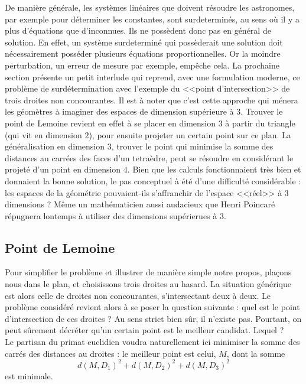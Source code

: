\documentclass{article}
\begin{document}
De manière générale, les systèmes linéaires que doivent résoudre les astronomes, par exemple pour déterminer les constantes, sont surdeterminés, au sens où il y a plus d'équations que d'inconnues. Ils ne possèdent donc pas en général de solution. En effet, un système surdeterminé qui possèderait une solution doit nécessairement posséder plusieurs équations proportionnelles. Or la moindre perturbation, un erreur de mesure par exemple, empêche cela. La prochaine section présente un petit interlude qui reprend, avec une formulation moderne, ce problème de surdétermination avec l'exemple du <<point d'intersection>> de trois droites non concourantes. Il est à noter que c'est cette approche qui ménera les géomètres à imaginer des espaces de dimension supérieure à $3$. Trouver le point de Lemoine revient en effet à se placer en dimension $3$ à partir du triangle (qui vit en dimension $2$), pour ensuite projeter un certain point sur ce plan. La généralisation en dimension $3$, trouver le point qui minimise la somme des distances au carrées des faces d'un tetraèdre, peut se résoudre en considérant le projeté d'un point en dimension $4$. Bien que les calculs fonctionnaient très bien et donnaient la bonne solution, le pas conceptuel à été d'une difficulté considérable : les espaces de la géométrie pouvaient-ils s'affranchir de l'espace <<réel>> à $3$ dimensions ? Même un mathématicien aussi audacieux que Henri Poincaré répugnera lontemps à utiliser des dimensions supérierues à $3$.

\subsection{Point de Lemoine}
 Pour simplifier le problème et illustrer de manière simple notre propos, plaçons nous dans le plan, et choisissons trois droites au hasard. La situation générique est alors celle de droites non concourantes, s'intersectant deux à deux. Le problème considéré revient alors à se poser la question suivante : quel est le point d'intersection de ces droites ? Au sens strict bien sûr, il n'existe pas. Pourtant, on peut sûrement décréter qu'un certain point est le meilleur candidat. Lequel ?\\

Le partisan du primat euclidien voudra naturellement ici minimiser la somme des carrés des distances au droites : le meilleur point est celui, $M$, dont la somme 
  \[d(M,D_1)^2+d(M,D_2)^2+d(M,D_3)^2\]
est minimale.\\
\end{document}
